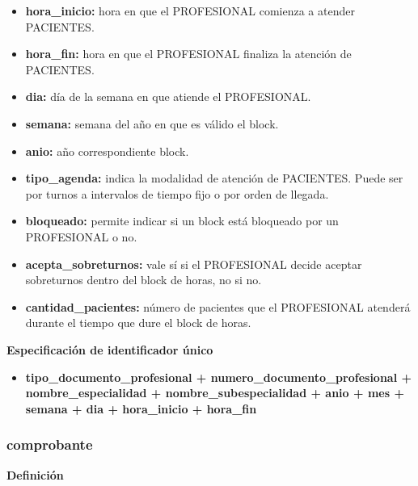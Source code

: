 \documentclass[a4paper,11pt]{article}
\begin{document}
\begin{itemize}


     \item \textbf{hora\_inicio:} hora en que el PROFESIONAL comienza a atender PACIENTES.

     \item \textbf{hora\_fin:} hora en que el PROFESIONAL finaliza la atención de PACIENTES.

     \item \textbf{dia:} día de la semana en que atiende el PROFESIONAL.

     \item \textbf{semana:} semana del año en que es válido el block.

	 \item \textbf{anio:} año correspondiente block.
	 
     \item \textbf{tipo\_agenda:} indica la modalidad de atención de PACIENTES. Puede ser por 
     turnos a intervalos de tiempo fijo o por orden de llegada.

     \item \textbf{bloqueado:} permite indicar si un block está bloqueado por un PROFESIONAL o no.

     \item \textbf{acepta\_sobreturnos:} vale sí si el PROFESIONAL decide aceptar sobreturnos dentro 
     del block de horas, no si no.

     \item \textbf{cantidad\_pacientes:} número de pacientes que el PROFESIONAL atenderá durante el tiempo que dure el block de horas.

\end{itemize}

\textbf{Especificación de identificador único}

\begin{itemize}
	\item \textbf{tipo\_documento\_profesional + numero\_documento\_profesional + nombre\_especialidad + nombre\_subespecialidad + anio + mes + semana + dia + hora\_inicio + hora\_fin }
   

\end{itemize}

\subsubsection{\textbf{comprobante}}

\textbf{Definición}
\end{document}
